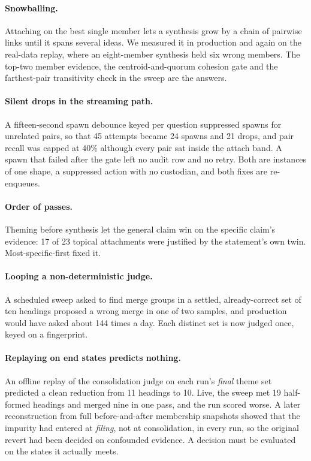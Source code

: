 \documentclass{article}
\begin{document}
\paragraph{Snowballing.} Attaching on the best single member lets a synthesis grow by a chain of pairwise links until it spans several ideas. We measured it in production and again on the real-data replay, where an eight-member synthesis held six wrong members. The top-two member evidence, the centroid-and-quorum cohesion gate and the farthest-pair transitivity check in the sweep are the answers.

\paragraph{Silent drops in the streaming path.} A fifteen-second spawn debounce keyed per question suppressed spawns for unrelated pairs, so that 45 attempts became 24 spawns and 21 drops, and pair recall was capped at 40\% although every pair sat inside the attach band. A spawn that failed after the gate left no audit row and no retry. Both are instances of one shape, a suppressed action with no custodian, and both fixes are re-enqueues.

\paragraph{Order of passes.} Theming before synthesis let the general claim win on the specific claim's evidence: 17 of 23 topical attachments were justified by the statement's own twin. Most-specific-first fixed it.

\paragraph{Looping a non-deterministic judge.} A scheduled sweep asked to find merge groups in a settled, already-correct set of ten headings proposed a wrong merge in one of two samples, and production would have asked about 144 times a day. Each distinct set is now judged once, keyed on a fingerprint.

\paragraph{Replaying on end states predicts nothing.} An offline replay of the consolidation judge on each run's \emph{final} theme set predicted a clean reduction from 11 headings to 10. Live, the sweep met 19 half-formed headings and merged nine in one pass, and the run scored worse. A later reconstruction from full before-and-after membership snapshots showed that the impurity had entered at \emph{filing}, not at consolidation, in every run, so the original revert had been decided on confounded evidence. A decision must be evaluated on the states it actually meets.
\end{document}
